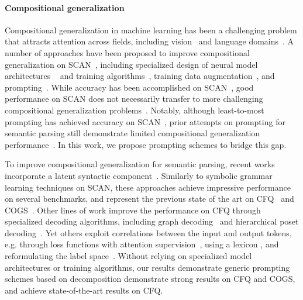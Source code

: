 \documentclass{article} \usepackage{iclr2022_conference,times}
\begin{document}
\paragraph{Compositional generalization} Compositional generalization in machine learning has been a challenging problem that attracts attention across fields, including vision~\citep{johnson2017clevr,bahdanau2019closure,ruis2020benchmark,nikolaus2019compositional} and language domains~\citep{Lake2018GeneralizationWS,Keysers2020MeasuringCG,kim-linzen-2020-cogs,shaw2020compositional,yin-etal-2021-compositional,gan-etal-2022-measuring}. A number of approaches have been proposed to improve compositional generalization on SCAN~\citep{Lake2018GeneralizationWS,loula-etal-2018-rearranging}, including specialized design of neural model architectures ~\citep{xinyun2020neuralsymbolic,nye2020learning,liu2020compositional,shaw2020compositional,russin2019compositional,li2019compositional,gordon2019permutation,herzig2020span} and training algorithms~\citep{lake2019compositional,kim2021sequence}, training data augmentation~\citep{andreas-2020-good,ekina2021recombine}, and prompting~\citep{zhou2022leasttomost}. While  accuracy has been accomplished on SCAN~\citep{xinyun2020neuralsymbolic,nye2020learning,liu2020compositional,shaw2020compositional}, good performance on SCAN does not necessarily transfer to more challenging compositional generalization problems~\citep{Furrer2020CompositionalGI}. Notably, although least-to-most prompting has achieved  accuracy on SCAN~\citep{zhou2022leasttomost}, prior attempts on prompting for semantic parsing still demonstrate limited compositional generalization performance~\citep{Qiu2022EvaluatingTI}. In this work, we propose prompting schemes to bridge this gap.

To improve compositional generalization for semantic parsing, recent works incorporate a latent syntactic component~\citep{qiu-etal-2022-improving,liu-etal-2021-learning-algebraic}. Similarly to symbolic grammar learning techniques on SCAN, these approaches achieve impressive performance on several benchmarks, and represent the previous state of the art on CFQ~\citep{Keysers2020MeasuringCG} and COGS~\citep{kim-linzen-2020-cogs}. Other lines of work improve the performance on CFQ through specialized decoding algorithms, including graph decoding~\citep{gai-etal-2021-grounded-graph} and hierarchical poset decoding~\citep{guo2020hierarchical}. Yet others exploit correlations between the input and output tokens, e.g. through loss functions with attention supervision~\citep{yin-etal-2021-compositional}, using a lexicon \citep{akyurek2021lexicon}, and reformulating the label space~\citep{herzig2021unlocking}. Without relying on specialized model architectures or training algorithms, our results demonstrate generic prompting schemes based on decomposition demonstrate strong results on CFQ and COGS, and achieve state-of-the-art results on CFQ.
\end{document}
